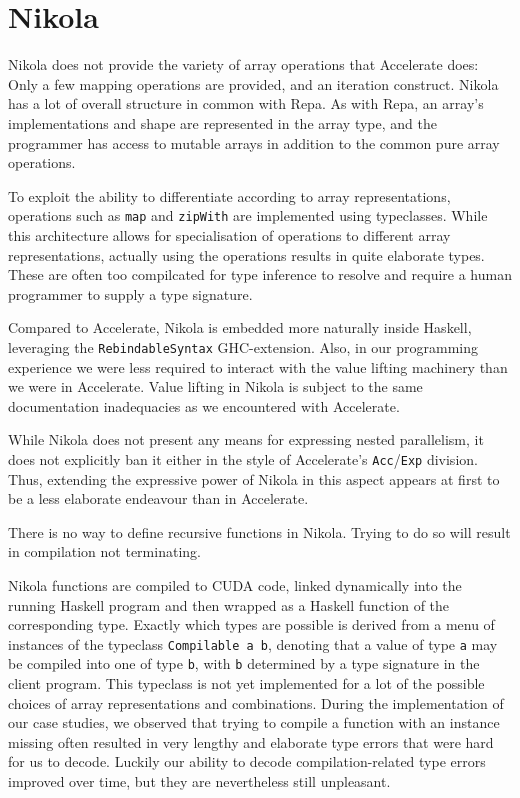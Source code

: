 \section{Nikola}
\label{sec:language-discussion-nikola}

Nikola does not provide the variety of array operations that Accelerate does: Only
a few mapping operations are provided, and an iteration construct.  Nikola has
a lot of overall structure in common with Repa. As with Repa, an array's
implementations and shape are represented in the array type, and the programmer
has access to mutable arrays in addition to the common pure array operations.

To exploit the ability to differentiate according to array representations,
operations such as \texttt{map} and \texttt{zipWith} are implemented using
typeclasses.  While this architecture allows for specialisation of operations
to different array representations, actually using the operations results in quite
elaborate types. These are often too compilcated for type inference to resolve
and require a human programmer to supply a type signature.

Compared to Accelerate, Nikola is embedded more naturally inside Haskell,
leveraging the \texttt{RebindableSyntax} GHC-extension. Also, in our programming
experience we were less required to interact with the value lifting machinery
than we were in Accelerate. Value lifting in Nikola is subject to the same
documentation inadequacies as we encountered with Accelerate.

While Nikola does not present any means for expressing nested parallelism, it
does not explicitly ban it either in the style of Accelerate's
\texttt{Acc}/\texttt{Exp} division. Thus, extending the expressive power of
Nikola in this aspect appears at first to be a less elaborate endeavour than in
Accelerate.

There is no way to define recursive functions in Nikola. Trying to do so
will result in compilation not terminating.

Nikola functions are compiled to CUDA code, linked dynamically into
the running Haskell program and then wrapped as a Haskell function of
the corresponding type.  Exactly which types are possible is derived
from a menu of instances of the typeclass \texttt{Compilable a b},
denoting that a value of type \texttt{a} may be compiled into one of
type \texttt{b}, with \texttt{b} determined by a type signature in the
client program. This typeclass is not yet implemented for a lot of the
possible choices of array representations and combinations. During the
implementation of our case studies, we observed that trying to compile
a function with an instance missing often resulted in very lengthy and
elaborate type errors that were hard for us to decode. Luckily our
ability to decode compilation-related type errors improved over time,
but they are nevertheless still unpleasant.

